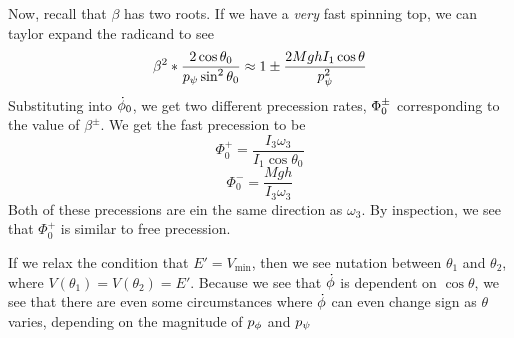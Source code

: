 Now, recall that \(\beta\) has two roots. If we have a \emph{very} fast spinning top, we can taylor expand the radicand to see
\[\beta^2 * \frac{2\cos\theta_0}{p_\psi\sin^2\theta_0}\approx 1\pm \frac{2MghI_1\cos\theta}{p_\psi^2}\]
Substituting into \(\dot{\phi}_0\), we get two different precession rates, \(\Phi_0^\pm\) corresponding to the value of \(\beta^\pm\).
We get the fast precession to be
\[\Phi_0^+ = \frac{I_3\omega_3}{I_1\cos\theta_0}\]
\[\Phi_0^- = \frac{Mgh}{I_3\omega_3}\]
Both of these precessions are ein the same direction as \(\omega_3\). By inspection, we see that \(\Phi_0^+\) is similar to free precession.

If we relax the condition that \(E' = V_{\min}\), then we see nutation between \(\theta_1\) and \(\theta_2\), where \(V(\theta_1) = V(\theta_2) = E'\). Because we see that \(\dot{\phi}\) is dependent on \(\cos\theta\), we see that there are even some circumstances where \(\dot{\phi}\) can even change sign as \(\theta\) varies, depending on the magnitude of \(p_\phi\) and \(p_\psi\)


